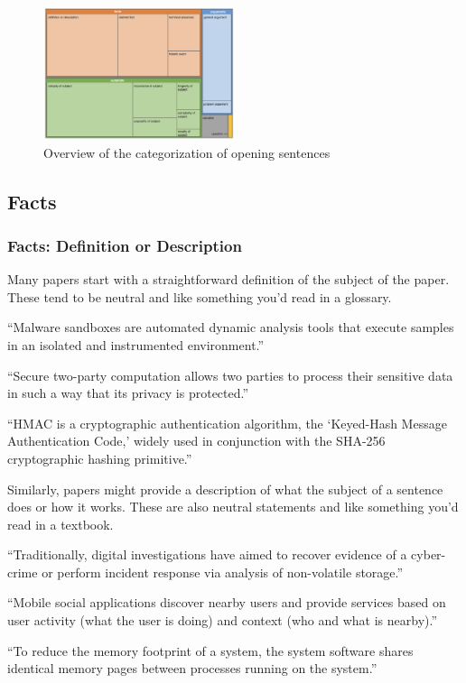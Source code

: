 \documentclass[sigconf]{acmart}
\begin{document}
	\label{sec:categories}
	\begin{figure}[t]
		\centering
		\includegraphics[width=0.5\textwidth]{image.png}
		\caption{Overview of the categorization of opening sentences}
		\label{fig:overview}
	\end{figure}
	\subsection{Facts}
	\subsubsection{Facts: Definition or Description}
	
	Many papers start with a straightforward definition of the subject of the paper. These tend to be neutral and like something you’d read in a glossary.
	
	``Malware sandboxes are automated dynamic analysis tools that execute samples in an isolated and instrumented environment.''
	
	``Secure two-party computation allows two parties to process their sensitive data in such a way that its privacy is protected.''
	
	``HMAC is a cryptographic authentication algorithm, the ‘Keyed-Hash Message Authentication Code,’ widely used in conjunction with the SHA-256 cryptographic hashing primitive.''
	
	Similarly, papers might provide a description of what the subject of a sentence does or how it works. These are also neutral statements and like something you’d read in a textbook. 
	
	``Traditionally, digital investigations have aimed to recover evidence of a cyber-crime or perform incident response via analysis of non-volatile storage.''
	
	``Mobile social applications discover nearby users and provide services based on user activity (what the user is doing) and context (who and what is nearby).''
	
	``To reduce the memory footprint of a system, the system software shares identical memory pages between processes running on the system.''
	
\end{document}

